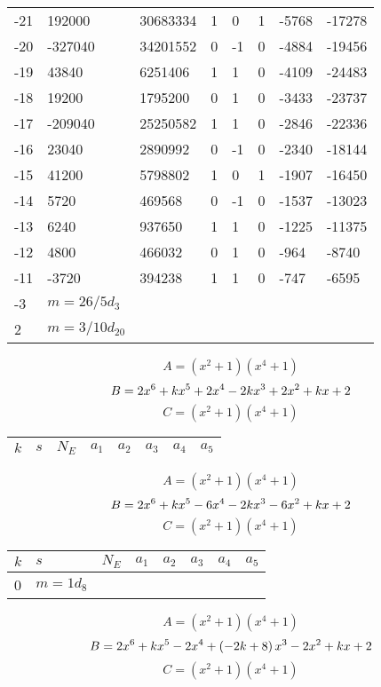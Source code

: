 \documentclass{amsart}
\begin{document}
\begin{longtable}{|l|l|l|lllll|}
-21&192000&30683334&1&0&1&-5768&-17278\\
-20&-327040&34201552&0&-1&0&-4884&-19456\\
-19&43840&6251406&1&1&0&-4109&-24483\\
-18&19200&1795200&0&1&0&-3433&-23737\\
-17&-209040&25250582&1&1&0&-2846&-22336\\
-16&23040&2890992&0&-1&0&-2340&-18144\\
-15&41200&5798802&1&0&1&-1907&-16450\\
-14&5720&469568&0&-1&0&-1537&-13023\\
-13&6240&937650&1&1&0&-1225&-11375\\
-12&4800&466032&0&1&0&-964&-8740\\
-11&-3720&394238&1&1&0&-747&-6595\\
-3&$m=26/5d_{3}$&&\multicolumn{5}{c|}{}\\
2&$m=3/10d_{20}$&&\multicolumn{5}{c|}{}\\
\hline
\end{longtable}
$$A=(x^2
 + 1)(x^4
 + 1)$$
$$B=2\*x^6
 + k\*x^5
 + 2\*x^4
 - 2\*k\*x^3
 + 2\*x^2
 + k\*x
 + 2$$
$$C=(x^2
 + 1)(x^4
 + 1)$$
\begin{longtable}{|l|l|l|lllll|}
\hline
$k$ & $s$ & $N_E$ & $a_1$ & $a_2$ & $a_3$ & $a_4$ & $a_5$\\
\hline
\hline
\end{longtable}
$$A=(x^2
 + 1)(x^4
 + 1)$$
$$B=2\*x^6
 + k\*x^5
 - 6\*x^4
 - 2\*k\*x^3
 - 6\*x^2
 + k\*x
 + 2$$
$$C=(x^2
 + 1)(x^4
 + 1)$$
\begin{longtable}{|l|l|l|lllll|}
\hline
$k$ & $s$ & $N_E$ & $a_1$ & $a_2$ & $a_3$ & $a_4$ & $a_5$\\
\hline
0&$m=1d_{8}$&&\multicolumn{5}{c|}{}\\
\hline
\end{longtable}
$$A=(x^2
 + 1)(x^4
 + 1)$$
$$B=2\*x^6
 + k\*x^5
 - 2\*x^4
 + \left(-2\*k
 + 8\right) \*x^3
 - 2\*x^2
 + k\*x
 + 2$$
$$C=(x^2
 + 1)(x^4
 + 1)$$
\end{document}
